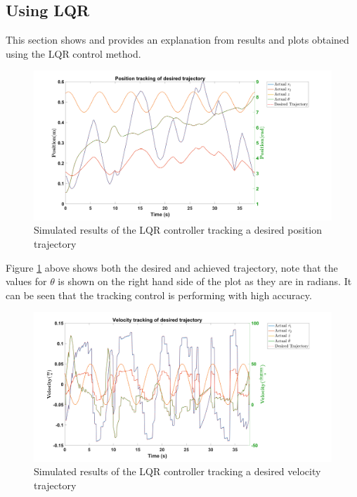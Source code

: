 \documentclass{UoNMCHA}
\numberwithin{equation}{section}
\begin{document}
\subsection{Using LQR}

This section shows and provides an explanation from results and plots obtained using the LQR control method.
	
	\begin{figure}[H]
		\begin{center}
			\includegraphics[width=1\linewidth]{figs/Picture27}
			\caption{Simulated results of the LQR controller tracking a desired position trajectory}
			\label{figs/Picture27}
		\end{center}
	\end{figure}
	
	
	Figure \ref{figs/Picture27} above shows both the desired and achieved trajectory, note that the values for $\theta$ is shown on the right hand side of the plot as they are in radians. It can be seen that the tracking control is performing with high accuracy.
	
	\begin{figure}[H]
		\begin{center}
			\includegraphics[width=1\linewidth]{figs/Picture28}
			\caption{Simulated results of the LQR controller tracking a desired velocity trajectory}
			\label{figs/Picture28}
		\end{center}
	\end{figure}
	
\end{document}
